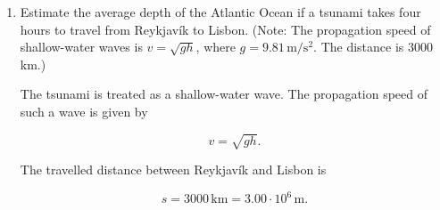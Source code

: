 \documentclass[letterpaper,12pt]{letter}
\begin{document}
\begin{enumerate}[label=\Roman*.]
\begin{enumerate}[label=\arabic*.]
The moment of inertia is

$$I=\frac{1}{2}MR^2=\frac{1}{2}\cdot50\,\mathrm{kg}\cdot(0.6\,\mathrm{m})^2=9.0\,\mathrm{kg\,m^2}.$$

Therefore,

$$K_{\mathrm{rot}}=\frac{1}{2}\cdot9.0\,\mathrm{kg\,m^2}\cdot(25\,\mathrm{rad/s})^2=2812.5\,\mathrm{J}.$$

The total kinetic energy is

$$K_{\mathrm{total}}=K_{\mathrm{trans}}+K_{\mathrm{rot}}=2812.5\,\mathrm{J}+2812.5\,\mathrm{J}=5625\,\mathrm{J}.$$

Thus,

$$\boxed{K_{\mathrm{total}}=5.63\cdot10^3\,\mathrm{J}}.$$


\pagebreak
\item Estimate the average depth of the Atlantic Ocean if a tsunami takes four hours to travel from Reykjavík to Lisbon. (Note: The propagation speed of shallow-water waves is $v=\sqrt{gh}$, where $g=9.81\,\mathrm{m/s^{2}}$. The distance is $3000$\,km.)

\bigskip

\begin{center}
\end{center}

The tsunami is treated as a shallow-water wave. The propagation speed of such a wave is given by

$$v=\sqrt{gh}.$$

The travelled distance between Reykjavík and Lisbon is

$$s=3000\,\mathrm{km}=3.00\cdot10^6\,\mathrm{m}.$$


\end{enumerate}
\end{enumerate}
\end{document}
